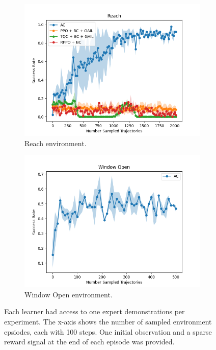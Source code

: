 \begin{figure}[htbp]
    \centering
    \begin{subfigure}[b]{0.45\textwidth}
      \includegraphics[width=\textwidth]{images/1_2000/Reach.png}
      \caption{Reach environment.}
      \label{fig:plot1}
    \end{subfigure}
    \hfill
    \begin{subfigure}[b]{0.45\textwidth}
      \includegraphics[width=\textwidth]{images/1_2000/Window Open.png}
      \caption{Window Open environment.}
      \label{fig:plot2}
    \end{subfigure}
    \caption{Each learner had access to one expert demonstrations per experiment. 
    The x-axis shows the number of sampled environment epsiodes, each with 100 steps. One initial observation and a sparse reward signal at the end of each episode was provided.}
    \label{fig:fourplots}
\end{figure}

